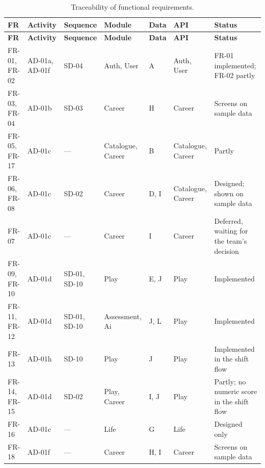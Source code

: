 {\footnotesize
\begin{longtable}{|>{\raggedright\arraybackslash}p{}|>{\raggedright\arraybackslash}p{}|>{\raggedright\arraybackslash}p{}|>{\raggedright\arraybackslash}p{}|>{\raggedright\arraybackslash}p{}|>{\raggedright\arraybackslash}p{}|>{\raggedright\arraybackslash}p{}|}
\caption{Traceability of functional requirements.} \\
\hline
\textbf{FR} & \textbf{Activity} & \textbf{Sequence} & \textbf{Module} & \textbf{Data} & \textbf{API} & \textbf{Status} \\ \hline
\endfirsthead
\hline
\textbf{FR} & \textbf{Activity} & \textbf{Sequence} & \textbf{Module} & \textbf{Data} & \textbf{API} & \textbf{Status} \\ \hline
\endhead
FR-01, FR-02 & AD-01a, AD-01f & SD-04 & Auth, User & A & Auth, User & FR-01 implemented; FR-02 partly \\ \hline
FR-03, FR-04 & AD-01b & SD-03 & Career & H & Career & Screens on sample data \\ \hline
FR-05, FR-17 & AD-01c & --- & Catalogue, Career & B & Catalogue, Career & Partly \\ \hline
FR-06, FR-08 & AD-01c & SD-02 & Career & D, I & Catalogue, Career & Designed; shown on sample data \\ \hline
FR-07 & AD-01c & --- & Career & I & Career & Deferred, waiting for the team's decision \\ \hline
FR-09, FR-10 & AD-01d & SD-01, SD-10 & Play & E, J & Play & Implemented \\ \hline
FR-11, FR-12 & AD-01d & SD-01, SD-10 & Assessment, Ai & J, L & Play & Implemented \\ \hline
FR-13 & AD-01h & SD-10 & Play & J & Play & Implemented in the shift flow \\ \hline
FR-14, FR-15 & AD-01d & SD-02 & Play, Career & I, J & Play & Partly; no numeric score in the shift flow \\ \hline
FR-16 & AD-01c & --- & Life & G & Life & Designed only \\ \hline
FR-18 & AD-01f & --- & Career & H, I & Career & Screens on sample data \\ \hline

\end{longtable}}
